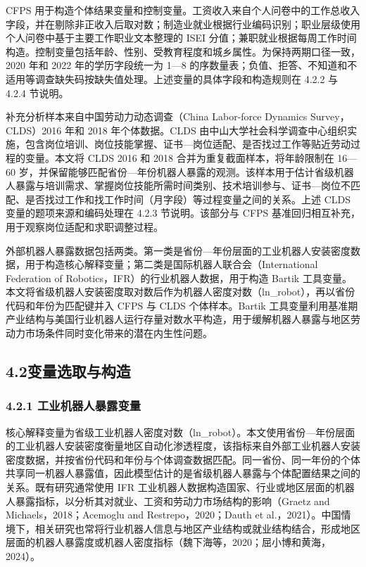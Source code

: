 CFPS 用于构造个体结果变量和控制变量。工资收入来自个人问卷中的工作总收入字段，并在剔除非正收入后取对数；制造业就业根据行业编码识别；职业层级使用个人问卷中基于主要工作职业文本整理的 ISEI 分值；兼职就业根据每周工作时间构造。控制变量包括年龄、性别、受教育程度和城乡属性。为保持两期口径一致，2020 年和 2022 年的学历字段统一为 1---8 的序数量表；负值、拒答、不知道和不适用等调查缺失码按缺失值处理。上述变量的具体字段和构造规则在 4.2.2 与 4.2.4 节说明。

补充分析样本来自中国劳动力动态调查（China Labor-force Dynamics Survey，CLDS）2016 年和 2018 年个体数据。CLDS 由中山大学社会科学调查中心组织实施，包含岗位培训、岗位技能掌握、证书---岗位适配、是否找过工作等贴近劳动过程的变量。本文将 CLDS 2016 和 2018 合并为重复截面样本，将年龄限制在 16---60 岁，并保留能够匹配省份---年份机器人暴露的观测。该样本用于估计省级机器人暴露与培训需求、掌握岗位技能所需时间类别、技术培训参与、证书---岗位不匹配、是否找过工作和找工作时间（月字段）等过程变量之间的关系。上述 CLDS 变量的题项来源和编码处理在 4.2.3 节说明。该部分与 CFPS 基准回归相互补充，用于观察岗位适配和求职调整过程。

外部机器人暴露数据包括两类。第一类是省份---年份层面的工业机器人安装密度数据，用于构造核心解释变量；第二类是国际机器人联合会（International Federation of Robotics，IFR）的行业机器人数据，用于构造 Bartik 工具变量。本文将省级机器人安装密度取对数后作为机器人密度对数（ln\_robot），再以省份代码和年份为匹配键并入 CFPS 与 CLDS 个体样本。Bartik 工具变量利用基准期产业结构与美国行业机器人运行存量对数水平构造，用于缓解机器人暴露与地区劳动力市场条件同时变化带来的潜在内生性问题。

\subsection{4.2变量选取与构造}\label{ux53d8ux91cfux9009ux53d6ux4e0eux6784ux9020}

\subsubsection{4.2.1 工业机器人暴露变量}\label{ux5de5ux4e1aux673aux5668ux4ebaux66b4ux9732ux53d8ux91cf}

核心解释变量为省级工业机器人密度对数（ln\_robot）。本文使用省份---年份层面的工业机器人安装密度衡量地区自动化渗透程度，该指标来自外部工业机器人安装密度数据，并按省份代码和年份与个体调查数据匹配。同一省份、同一年份的个体共享同一机器人暴露值，因此模型估计的是省级机器人暴露与个体配置结果之间的关系。既有研究通常使用 IFR 工业机器人数据构造国家、行业或地区层面的机器人暴露指标，以分析其对就业、工资和劳动力市场结构的影响（Graetz and Michaels，2018；Acemoglu and Restrepo，2020；Dauth et al.，2021）。中国情境下，相关研究也常将行业机器人信息与地区产业结构或就业结构结合，形成地区层面的机器人暴露度或机器人密度指标（魏下海等，2020；屈小博和黄海，2024）。

